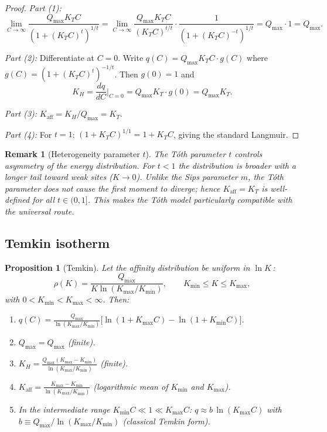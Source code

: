 \documentclass[12pt]{article}
\newtheorem{proposition}{Proposition}
\newtheorem{remark}{Remark}
\begin{document}
\begin{proof}
\textit{Part (1):}
\[
  \lim_{C\to\infty} \frac{Q_{\max}K_T C}{(1+(K_T C)^t)^{1/t}}
  = \lim_{C\to\infty} \frac{Q_{\max}K_T C}{(K_T C)^{t/t}}
    \cdot\frac{1}{(1+(K_TC)^{-t})^{1/t}}
  = Q_{\max}\cdot 1 = Q_{\max}.
\]

\textit{Part (2):}  Differentiate at $C=0$.  Write
$q(C)=Q_{\max}K_T C\cdot g(C)$ where
$g(C)=(1+(K_T C)^t)^{-1/t}$.  Then $g(0)=1$ and
\[
  K_H = \frac{dq}{dC}\bigg|_{C=0} = Q_{\max}K_T\cdot g(0) = Q_{\max}K_T.
\]

\textit{Part (3):} $K_{\mathrm{aff}}=K_H/Q_{\max}=K_T$.

\textit{Part (4):} For $t=1$:
$(1+K_T C)^{1/1}=1+K_T C$, giving the standard Langmuir.
\end{proof}

\begin{remark}[Heterogeneity parameter $t$]
The T\'oth parameter $t$ controls asymmetry of the energy
distribution.  For $t<1$ the distribution is broader with a longer
tail toward weak sites ($K\to 0$).  Unlike the Sips parameter $m$,
the T\'oth parameter does \emph{not} cause the first moment to
diverge; hence $K_{\mathrm{aff}}=K_T$ is well-defined for all
$t\in(0,1]$.  This makes the T\'oth model particularly compatible
with the universal route.
\end{remark}

\subsection{Temkin isotherm}

\begin{proposition}[Temkin]
\label{prop:temkin}
Let the affinity distribution be uniform in $\ln K$\,:
\begin{equation}
  \rho(K) = \frac{Q_{\max}}{K\ln(K_{\max}/K_{\min})},
  \qquad K_{\min}\le K \le K_{\max},
  \label{eq:temkin_dist}
\end{equation}
with $0<K_{\min}<K_{\max}<\infty$.  Then:
\begin{enumerate}[nosep]
  \item $q(C) = \displaystyle\frac{Q_{\max}}{\ln(K_{\max}/K_{\min})}
        \bigl[\ln(1+K_{\max}C)-\ln(1+K_{\min}C)\bigr]$.
  \item $Q_{\max}=Q_{\max}$ (finite).
  \item $K_H = \displaystyle\frac{Q_{\max}(K_{\max}-K_{\min})}
        {\ln(K_{\max}/K_{\min})}$ (finite).
  \item $K_{\mathrm{aff}} = \displaystyle
        \frac{K_{\max}-K_{\min}}{\ln(K_{\max}/K_{\min})}$
        \quad (logarithmic mean of $K_{\min}$ and $K_{\max}$).
  \item In the intermediate range $K_{\min}C\ll 1\ll K_{\max}C$:
        $q\approx b\,\ln(K_{\max}C)$ with
        $b\equiv Q_{\max}/\ln(K_{\max}/K_{\min})$
        (classical Temkin form).
\end{enumerate}
\end{proposition}
\end{document}

